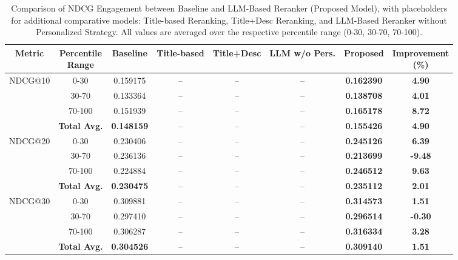 \begin{table*}[ht]
\centering
\renewcommand{\arraystretch}{1.2} %
\setlength{\tabcolsep}{8pt} %

\begin{tabular}{|c|c|c|c|c|c|c|c|}
\hline
\textbf{Metric} & \makecell{\textbf{Percentile} \\ \textbf{Range}} & \textbf{Baseline} & \textbf{Title-based} & \textbf{Title+Desc} & \textbf{LLM w/o Pers.} & \textbf{Proposed} & \makecell{\textbf{Improvement} \\ \textbf{(\%)}} \\
\hline
\multirow{4}{*}{NDCG@10} & 0-30    & 0.159175 & -- & -- & -- & \textbf{0.162390} & \textbf{4.90} \\
                          & 30-70   & 0.133364 & -- & -- & -- & \textbf{0.138708} & \textbf{4.01} \\
                          & 70-100  & 0.151939 & -- & -- & -- & \textbf{0.165178} & \textbf{8.72} \\
                          & \cellcolor{gray!20} \textbf{Total Avg.} & \cellcolor{gray!20} \textbf{0.148159} & \cellcolor{gray!20} -- & \cellcolor{gray!20} -- & \cellcolor{gray!20} -- & \cellcolor{gray!20} \textbf{0.155426} & \cellcolor{gray!20} \textbf{4.90} \\
\hline
\multirow{4}{*}{NDCG@20} & 0-30    & 0.230406 & -- & -- & -- & \textbf{0.245126} & \textbf{6.39} \\
                          & 30-70   & 0.236136 & -- & -- & -- & \textbf{0.213699} & \textbf{-9.48} \\
                          & 70-100  & 0.224884 & -- & -- & -- & \textbf{0.246512} & \textbf{9.63} \\
                          & \cellcolor{gray!20} \textbf{Total Avg.} & \cellcolor{gray!20} \textbf{0.230475} & \cellcolor{gray!20} -- & \cellcolor{gray!20} -- & \cellcolor{gray!20} -- & \cellcolor{gray!20} \textbf{0.235112} & \cellcolor{gray!20} \textbf{2.01} \\
\hline
\multirow{4}{*}{NDCG@30} & 0-30    & 0.309881 & -- & -- & -- & \textbf{0.314573} & \textbf{1.51} \\
                          & 30-70   & 0.297410 & -- & -- & -- & \textbf{0.296514} & \textbf{-0.30} \\
                          & 70-100  & 0.306287 & -- & -- & -- & \textbf{0.316334} & \textbf{3.28} \\
                          & \cellcolor{gray!20} \textbf{Total Avg.} & \cellcolor{gray!20} \textbf{0.304526} & \cellcolor{gray!20} -- & \cellcolor{gray!20} -- & \cellcolor{gray!20} -- & \cellcolor{gray!20} \textbf{0.309140} & \cellcolor{gray!20} \textbf{1.51} \\
\hline
\end{tabular}
\caption{Comparison of NDCG Engagement between Baseline and LLM-Based Reranker (Proposed Model), with placeholders for additional comparative models: Title-based Reranking, Title+Desc Reranking, and LLM-Based Reranker without Personalized Strategy. All values are averaged over the respective percentile range (0-30, 30-70, 70-100).}
\label{tab:ndcg_engagement_comparison}
\end{table*}
